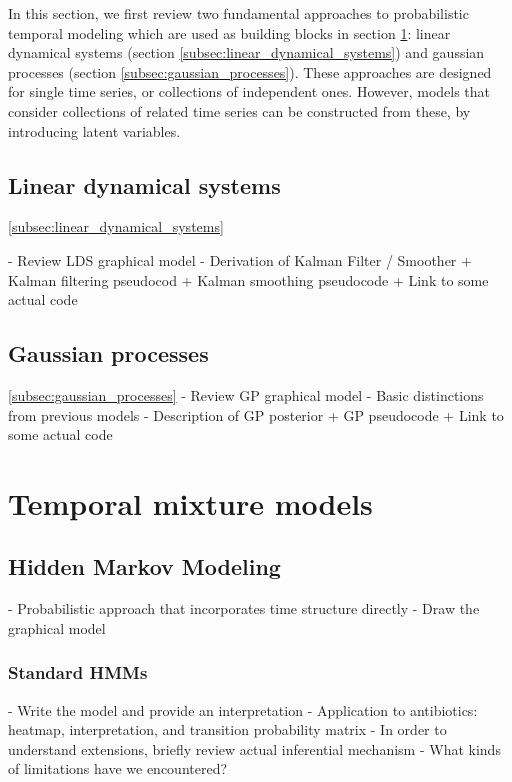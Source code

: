 \documentclass{article}
\begin{document}
In this section, we first review two fundamental approaches to probabilistic
temporal modeling which are used as building blocks in section
\ref{sec:temporal_mixture_models}: linear dynamical systems (section
\ref{subsec:linear_dynamical_systems}) and gaussian processes (section
\ref{subsec:gaussian_processes}). These approaches are designed for single time
series, or collections of independent ones. However, models that consider
collections of related time series can be constructed from these, by introducing
latent variables.

\subsection{Linear dynamical systems}
\ref{subsec:linear_dynamical_systems}

- Review LDS graphical model
- Derivation of Kalman Filter / Smoother
  + Kalman filtering pseudocod
  + Kalman smoothing pseudocode
  + Link to some actual code

\subsection{Gaussian processes}
\ref{subsec:gaussian_processes}
- Review GP graphical model
- Basic distinctions from previous models
- Description of GP posterior
  + GP pseudocode
  + Link to some actual code

\section{Temporal mixture models}
\label{sec:temporal_mixture_models}

\subsection{Hidden Markov Modeling}

- Probabilistic approach that incorporates time structure directly
- Draw the graphical model

\subsubsection{Standard HMMs}

- Write the model and provide an interpretation
- Application to antibiotics: heatmap, interpretation, and transition
probability matrix
- In order to understand extensions, briefly review actual inferential mechanism
- What kinds of limitations have we encountered?
\end{document}
